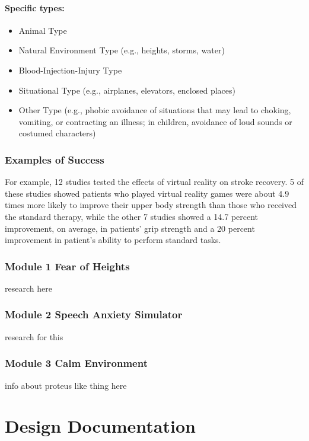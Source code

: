 \documentclass[a4paper,10pt]{article}
\begin{document}
\paragraph{Specific types:} 
\begin{itemize}
 \item Animal Type
 \item Natural Environment Type (e.g., heights, storms, water) 
 \item Blood-Injection-Injury Type 
 \item Situational Type (e.g., airplanes, elevators, enclosed places) 
 \item Other Type (e.g., phobic avoidance of situations that may lead to choking, vomiting, or contracting an illness; in children, avoidance of loud sounds or costumed characters)
\end{itemize}
\pagebreak
\subsubsection{Examples of Success}
For example, 12 studies tested the effects of virtual reality on stroke recovery. 5 of these studies showed patients who played virtual reality games were about 4.9 times more likely to improve their upper body strength than those who received the standard therapy, while the other 7  studies showed a 14.7 percent improvement, on average, in patients' grip strength and a 20 percent improvement in patient's ability to perform standard tasks.\cite{stroke1}
\pagebreak
\subsubsection{Module 1 Fear of Heights}
research here
\pagebreak
\subsubsection{Module 2 Speech Anxiety Simulator}
research for this
\pagebreak
\subsubsection{Module 3 Calm Environment}
info about proteus like thing here 
\pagebreak
\section{Design Documentation}
\end{document}
